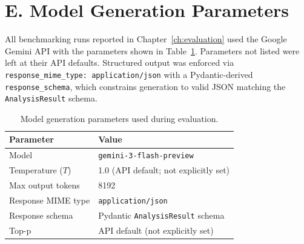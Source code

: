 \section*{E. Model Generation Parameters}

All benchmarking runs reported in Chapter~\ref{ch:evaluation} used the Google Gemini API with the parameters shown in Table~\ref{tab:model-params}. Parameters not listed were left at their API defaults. Structured output was enforced via \texttt{response\_mime\_type: application/json} with a Pydantic-derived \texttt{response\_schema}, which constrains generation to valid JSON matching the \texttt{AnalysisResult} schema.

\begin{table}[h]
\centering
\caption{Model generation parameters used during evaluation.}
\label{tab:model-params}
\begin{tabular}{ll}
\toprule
\textbf{Parameter} & \textbf{Value} \\
\midrule
Model & \texttt{gemini-3-flash-preview} \\
Temperature ($T$) & 1.0 (API default; not explicitly set) \\
Max output tokens & 8192 \\
Response MIME type & \texttt{application/json} \\
Response schema & Pydantic \texttt{AnalysisResult} schema \\
Top-p & API default (not explicitly set) \\
\bottomrule
\end{tabular}
\end{table}
